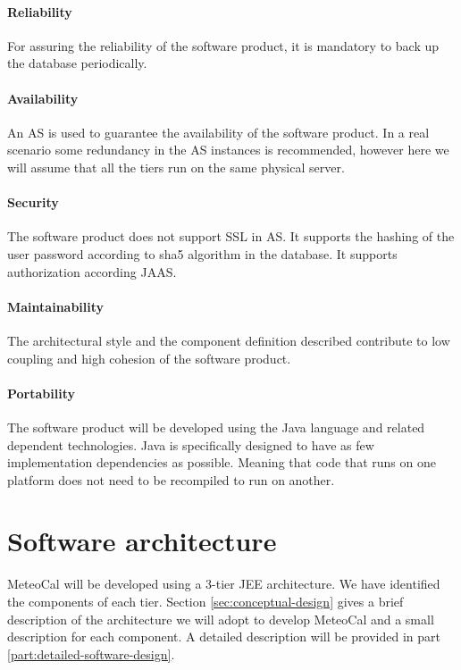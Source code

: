 \documentclass[10pt,a4paper,titlepage]{article}
\begin{document}
\subsection{Reliability}
For assuring the reliability of the software product, it is mandatory to back up the database periodically.

\subsection{Availability}
An AS is used to guarantee the availability of the software product. In a real scenario some redundancy in the AS instances is recommended, however here we will assume that all the tiers run on the same physical server.

\subsection{Security}
The software product does not support SSL in AS. It supports the hashing of the user password according to sha5 algorithm in the database. It supports authorization according JAAS.

\subsection{Maintainability}
The architectural style and the component definition described contribute to low coupling and high cohesion of the software product.

\subsection{Portability}
The software product will be developed using the Java language and related dependent technologies. Java is specifically designed to have as few implementation dependencies as possible. Meaning that code that runs on one platform does not need to be recompiled to run on another.

\clearpage
\part{Software architecture}
\label{part:software-architecture}
MeteoCal will be developed using a 3-tier JEE architecture. We have identified the components of each tier. Section \ref{sec:conceptual-design} gives a brief description of the architecture we will adopt to develop MeteoCal and a small description for each component. A detailed description will be provided in part \ref{part:detailed-software-design}.
\end{document}
